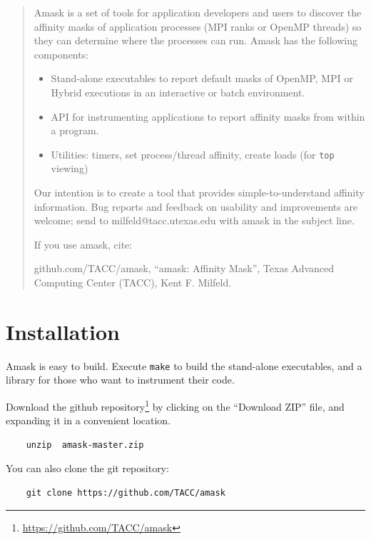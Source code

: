 \documentclass[10pt,a4paper]{report}
\begin{document}
\begin{abstract}

Amask is a set of tools for application developers and users to discover the affinity masks of application
processes (MPI ranks or OpenMP threads) so they can determine where the processes can run.
Amask has the following components:

\begin{itemize}
\item Stand-alone executables to report default masks of OpenMP, 
      MPI or Hybrid executions in an interactive or batch environment.
\item API for instrumenting applications to report affinity masks from within a program.
\item Utilities: timers, set process/thread affinity, create loads (for \verb+top+ viewing)
\end{itemize}


Our intention is to create a tool that provides simple-to-understand affinity
information. Bug reports and feedback on usability and improvements are welcome; 
send to milfeld@tacc.utexas.edu with amask in the subject line. 


If you use amask, cite:

github.com/TACC/amask, ``amask: Affinity Mask'', 
Texas Advanced Computing Center (TACC), Kent F. Milfeld. \cite{amask}

\end{abstract}

\tableofcontents

\chapter{Installation}
Amask is easy to build. Execute \verb+make+  to build the stand-alone executables, 
and a library for those who want to instrument their code.

Download the github repository\footnote{\href{https://github.com/TACC/amask}
{https://github.com/TACC/amask}} by clicking on the ``Download ZIP'' file, 
and expanding it in a convenient location.

\begin{verbatim}
    unzip  amask-master.zip
\end{verbatim}

You can also clone the git repository:

\begin{verbatim}
    git clone https://github.com/TACC/amask
\end{verbatim}
\end{document}
